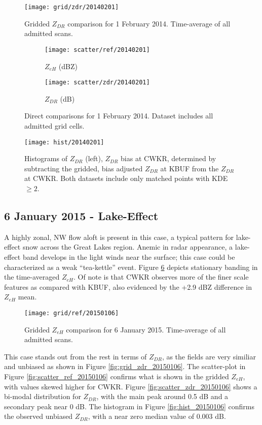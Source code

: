 \begin{figure}[H]
\texttt{[image: grid/zdr/20140201]}
\caption{Gridded $Z_{DR}$ comparison for 1 February 2014. Time-average of all admitted scans.} 
\label{fig:grid_zdr_20140201}
\end{figure}

\begin{figure}[H]
\centering
   \begin{subfigure}{0.49\linewidth} \centering
     \texttt{[image: scatter/ref/20140201]}
     \caption{$Z_{eH}$ (dBZ)}\label{fig:scatter_ref_20140201}
   \end{subfigure}
   \begin{subfigure}{0.49\linewidth} \centering
     \texttt{[image: scatter/zdr/20140201]}
     \caption{$Z_{DR}$ (dB)}\label{fig:scatter_zdr_20140201}
   \end{subfigure}
\caption{Direct comparisons for 1 February 2014. Dataset includes all admitted grid cells.} \label{fig:scatter_20140201}
\end{figure}

\begin{figure}[H]
\texttt{[image: hist/20140201]}\centering
\caption{Histograms of $Z_{DR}$ (left), $Z_{DR}$ bias at CWKR, determined by subtracting the gridded, bias adjusted $Z_{DR}$ at KBUF from the $Z_{DR}$ at
CWKR. Both datasets include only matched points with KDE $\geq 2$. } 
\label{fig:hist_20140201}
\end{figure}

\subsection{6 January 2015 - Lake-Effect}
A highly zonal, NW flow aloft is present in this case, a typical pattern for lake-effect snow across the Great Lakes region. Anemic in radar appearance, a
lake-effect band develops in the light winds near the surface; this case could be characterized as a weak ``tea-kettle'' event. Figure
\ref{fig:grid_ref_20150106} depicts stationary banding in the time-averaged $Z_{eH}$. Of note is that CWKR observes more of the finer scale features as
compared with KBUF, also evidenced by the +2.9 dBZ difference in $Z_{eH}$ mean. 
\begin{figure}[H]
\texttt{[image: grid/ref/20150106]}
\caption{Gridded $Z_{eH}$ comparison for 6 January 2015. Time-average of all admitted scans.} 
\label{fig:grid_ref_20150106}
\end{figure}
This case stands out from the rest in terms of $Z_{DR}$, as the fields are
very similiar and unbiased as shown in Figure \ref{fig:grid_zdr_20150106}. The scatter-plot in Figure
\ref{fig:scatter_ref_20150106} confirms what is shown in the gridded $Z_{eH}$, with values skewed higher for CWKR. Figure \ref{fig:scatter_zdr_20150106}
shows a bi-modal distribution for $Z_{DR}$, with the
main peak around 0.5 dB and a secondary peak near 0 dB. The histogram in Figure
\ref{fig:hist_20150106} confirms the observed unbiased $Z_{DR}$, with a near zero median value of 0.003 dB.


